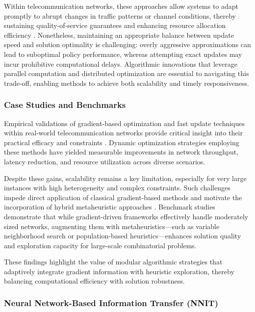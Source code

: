 Within telecommunication networks, these approaches allow systems to adapt promptly to abrupt changes in traffic patterns or channel conditions, thereby sustaining quality-of-service guarantees and enhancing resource allocation efficiency \cite{ref10}. Nonetheless, maintaining an appropriate balance between update speed and solution optimality is challenging: overly aggressive approximations can lead to suboptimal policy performance, whereas attempting exact updates may incur prohibitive computational delays. Algorithmic innovations that leverage parallel computation and distributed optimization are essential to navigating this trade-off, enabling methods to achieve both scalability and timely responsiveness.

\subsubsection{Case Studies and Benchmarks}

Empirical validations of gradient-based optimization and fast update techniques within real-world telecommunication networks provide critical insight into their practical efficacy and constraints \cite{ref1,ref4,ref10,ref37,ref47}. Dynamic optimization strategies employing these methods have yielded measurable improvements in network throughput, latency reduction, and resource utilization across diverse scenarios.

Despite these gains, scalability remains a key limitation, especially for very large instances with high heterogeneity and complex constraints. Such challenges impede direct application of classical gradient-based methods and motivate the incorporation of hybrid metaheuristic approaches \cite{ref37}. Benchmark studies demonstrate that while gradient-driven frameworks effectively handle moderately sized networks, augmenting them with metaheuristics—such as variable neighborhood search or population-based heuristics—enhances solution quality and exploration capacity for large-scale combinatorial problems.

These findings highlight the value of modular algorithmic strategies that adaptively integrate gradient information with heuristic exploration, thereby balancing computational efficiency with solution robustness.

\subsubsection{Neural Network-Based Information Transfer (NNIT)}

